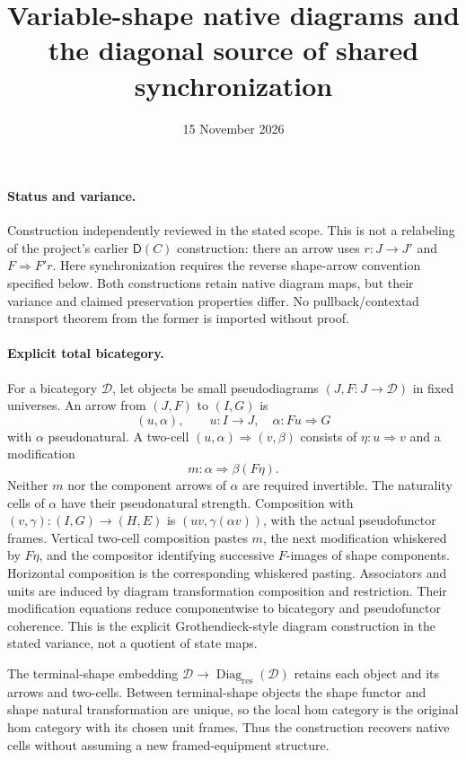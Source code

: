 \documentclass{article}
\title{Variable-shape native diagrams and the diagonal source of shared synchronization}
\date{15 November 2026}
\begin{document}
\maketitle
\paragraph{Status and variance.} Construction independently reviewed in the stated scope. This is not a relabeling of the project's earlier $\mathsf D(C)$ construction: there an arrow uses $r:J\to J'$ and $F\Rightarrow F'r$. Here synchronization requires the reverse shape-arrow convention specified below. Both constructions retain native diagram maps, but their variance and claimed preservation properties differ. No pullback/contextad transport theorem from the former is imported without proof.

\paragraph{Explicit total bicategory.} For a bicategory $\mathcal D$, let objects be small pseudodiagrams $(J,F:J\to\mathcal D)$ in fixed universes. An arrow from $(J,F)$ to $(I,G)$ is
\[
 (u,\alpha),\qquad u:I\to J,\quad\alpha:Fu\Rightarrow G
\]
with $\alpha$ pseudonatural. A two-cell $(u,\alpha)\Rightarrow(v,\beta)$ consists of $\eta:u\Rightarrow v$ and a modification
\[
 m:\alpha\Rightarrow\beta(F\eta).
\]
Neither $m$ nor the component arrows of $\alpha$ are required invertible. The naturality cells of $\alpha$ have their pseudonatural strength. Composition with $(v,\gamma):(I,G)\to(H,E)$ is $(uv,\gamma(\alpha v))$, with the actual pseudofunctor frames. Vertical two-cell composition pastes $m$, the next modification whiskered by $F\eta$, and the compositor identifying successive $F$-images of shape components. Horizontal composition is the corresponding whiskered pasting. Associators and units are induced by diagram transformation composition and restriction. Their modification equations reduce componentwise to bicategory and pseudofunctor coherence. This is the explicit Grothendieck-style diagram construction in the stated variance, not a quotient of state maps.

The terminal-shape embedding $\mathcal D\to\operatorname{Diag}_{\mathrm{res}}(\mathcal D)$ retains each object and its arrows and two-cells. Between terminal-shape objects the shape functor and shape natural transformation are unique, so the local hom category is the original hom category with its chosen unit frames. Thus the construction recovers native cells without assuming a new framed-equipment structure.
\end{document}
